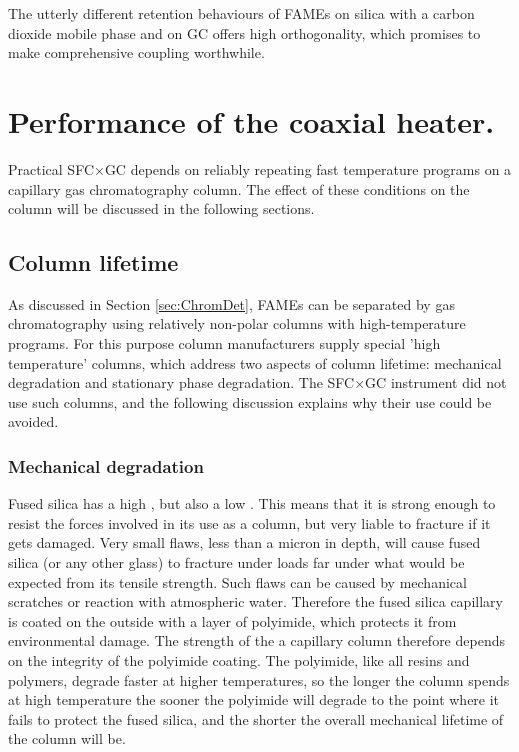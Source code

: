 
The utterly different retention behaviours of FAMEs on silica with a carbon
dioxide mobile phase and on GC offers high orthogonality, which promises to make
comprehensive coupling worthwhile.

\section[Coaxial heater performance.]{Performance of the coaxial heater.}

Practical SFC×GC depends on reliably repeating fast temperature programs on a
capillary gas chromatography column. The effect of these conditions on the
column will be discussed in the following sections.

\subsection{Column lifetime}

As discussed in Section \ref{sec:ChromDet}, FAMEs can be separated by gas
chromatography using relatively non-polar columns with high-temperature
programs. For this purpose column manufacturers supply special 'high
temperature' columns, which address two aspects of column lifetime: mechanical
degradation and stationary phase degradation. The SFC×GC instrument did not use
such columns, and the following discussion explains why their use could be
avoided.

\subsubsection{Mechanical degradation}
Fused silica has a high , but also a low
. This means that it is strong enough to resist the
forces involved in its use as a column, but very liable to fracture if it gets
damaged. Very small flaws, less than a micron in depth, will cause fused silica
(or any other glass) to fracture under loads far under what would be expected
from its tensile strength. Such flaws can be caused by mechanical scratches or
reaction with atmospheric water. Therefore the fused silica capillary is coated
on the outside with a layer of polyimide, which protects it from environmental
damage. The strength of the a capillary column therefore depends on the
integrity of the polyimide coating. The polyimide, like all resins and polymers,
degrade faster at higher temperatures, so the longer the column spends at high
temperature the sooner the polyimide will degrade to the point where it fails
to protect the fused silica, and the shorter the overall mechanical lifetime of
the column will be.


